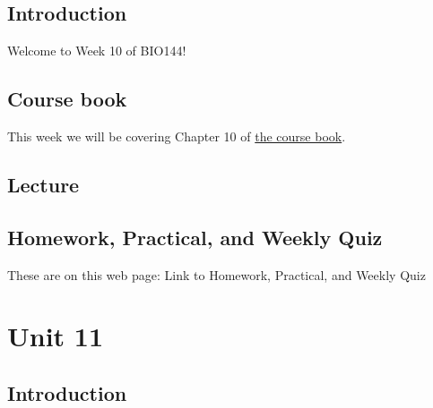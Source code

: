 \documentclass[
  letterpaper,
  8pt,
  a4paper]{book}
\begin{document}

\section*{Introduction}\label{introduction-10}


Welcome to Week 10 of BIO144!

\section*{Course book}\label{course-book-9}


This week we will be covering Chapter 10 of
\href{https://opetchey.github.io/BIO144_Course_Book/}{the course book}.

\section*{Lecture}\label{lecture-9}


\section*{Homework, Practical, and Weekly
Quiz}\label{homework-practical-and-weekly-quiz-9}


These are on this web page: Link to Homework, Practical, and Weekly Quiz


\chapter*{Unit 11}\label{unit-11}


\section*{Introduction}\label{introduction-11}
\end{document}
